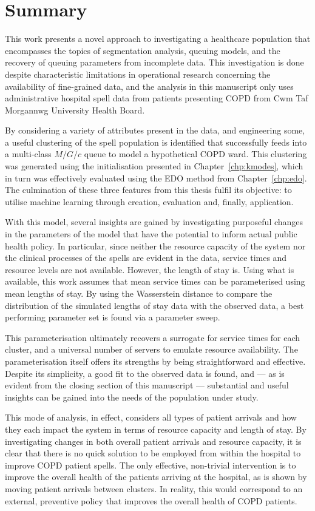 \documentclass[]{interact}
\theoremstyle{plain}%
\theoremstyle{definition}
\theoremstyle{remark}
\newcommand{\ctmuhb}{Cwm Taf Morgannwg University Health Board}
\begin{document}
\section{Summary}\label{sec:summary}

This work presents a novel approach to investigating a healthcare population
that encompasses the topics of segmentation analysis, queuing models, and the
recovery of queuing parameters from incomplete data. This investigation is done
despite characteristic limitations in operational research concerning the
availability of fine-grained data, and the analysis in this manuscript only uses
administrative hospital spell data from patients presenting COPD from \ctmuhb.

By considering a variety of attributes present in the data, and engineering
some, a useful clustering of the spell population is identified that
successfully feeds into a multi-class \(M/G/c\) queue to model a hypothetical
COPD ward. This clustering was generated using the initialisation presented in
Chapter~\ref{chp:kmodes}, which in turn was effectively evaluated using the
EDO method from Chapter~\ref{chp:edo}. The culmination of these three features
from this thesis fulfil its objective: to utilise machine learning through
creation, evaluation and, finally, application.

With this model, several insights are gained by investigating purposeful changes
in the parameters of the model that have the potential to inform actual public
health policy. In particular, since neither the resource capacity of the system
nor the clinical processes of the spells are evident in the data, service times
and resource levels are not available. However, the length of stay is. Using
what is available, this work assumes that mean service times can be
parameterised using mean lengths of stay. By using the Wasserstein distance to
compare the distribution of the simulated lengths of stay data with the observed
data, a best performing parameter set is found via a parameter sweep.

This parameterisation ultimately recovers a surrogate for service times for each
cluster, and a universal number of servers to emulate resource availability. The
parameterisation itself offers its strengths by being straightforward and
effective. Despite its simplicity, a good fit to the observed data is found,
and --- as is evident from the closing section of this manuscript --- substantial
and useful insights can be gained into the needs of the population under study.

This mode of analysis, in effect, considers all types of patient arrivals and
how they each impact the system in terms of resource capacity and length of
stay. By investigating changes in both overall patient arrivals and resource
capacity, it is clear that there is no quick solution to be employed from within
the hospital to improve COPD patient spells. The only effective, non-trivial
intervention is to improve the overall health of the patients arriving at the
hospital, as is shown by moving patient arrivals between clusters. In reality,
this would correspond to an external, preventive policy that improves the
overall health of COPD patients.




\end{document}
